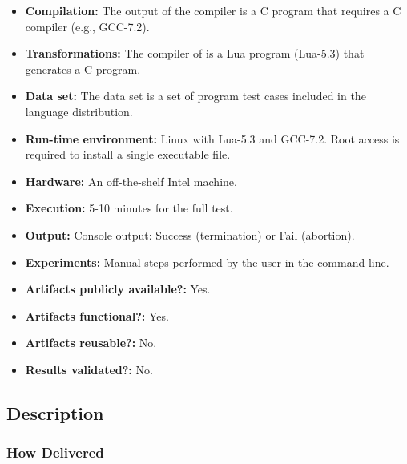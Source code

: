 {\small
\begin{itemize}
  \item {\bf Compilation: } The output of the \CEU compiler is a C program that requires a C compiler (e.g., GCC-7.2).
  \item {\bf Transformations: } The compiler of \CEU is a Lua program (Lua-5.3) that generates a C program.
  \item {\bf Data set: } The data set is a set of program test cases included in the language distribution.
  \item {\bf Run-time environment: } Linux with Lua-5.3 and GCC-7.2. Root access is required to install a single executable file.
  \item {\bf Hardware: } An off-the-shelf Intel machine.
  \item {\bf Execution: } 5-10 minutes for the full test.
  \item {\bf Output: } Console output: Success (termination) or Fail (abortion).
  \item {\bf Experiments: } Manual steps performed by the user in the command line.
\end{itemize}

\begin{itemize}
  \item {\bf Artifacts publicly available?:} Yes.
  \item {\bf Artifacts functional?:} Yes.
  \item {\bf Artifacts reusable?:} No.
  \item {\bf Results validated?:} No.
\end{itemize}

\subsection{Description}

\subsubsection{How Delivered}

}
